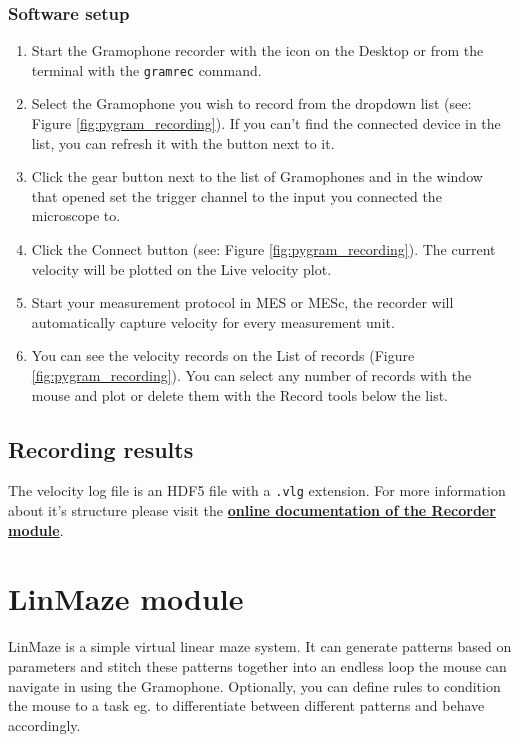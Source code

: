 \documentclass[11pt,a4paper]{article}
\begin{document}
\subsubsection{Software setup}
\begin{enumerate}
\item Start the Gramophone recorder with the icon on the Desktop or from the terminal with the \texttt{gramrec} command.
\item Select the Gramophone you wish to record from the dropdown list (see: Figure \ref{fig:pygram_recording}). If you can't find the connected device in the list, you can refresh it with the button next to it.
\item Click the gear button next to the list of Gramophones and in the window that opened set the trigger channel to the input you connected the microscope to.
\item Click the Connect button (see: Figure \ref{fig:pygram_recording}). The current velocity will be plotted on the Live velocity plot.
\item Start your measurement protocol in MES or MESc, the recorder will automatically capture velocity for every measurement unit.
\item You can see the velocity records on the List of records (Figure \ref{fig:pygram_recording}). You can select any number of records with the mouse and plot or delete them with the Record tools below the list.

\end{enumerate}

\subsection{Recording results \label{sec:recorder_out}}
The velocity log file is an HDF5 file with a \texttt{.vlg} extension. For more information about it's structure please visit the \href{http://gramophonetools.readthedocs.io/en/latest/gramrec_out.html}{\textbf{online documentation of the Recorder module}}.

\section{LinMaze module}
LinMaze is a simple virtual linear maze system. It can generate patterns based on parameters and stitch these patterns together into an endless loop the mouse can navigate in using the Gramophone. Optionally, you can define rules to condition the mouse to a task eg. to differentiate between different patterns and behave accordingly.
\end{document}
